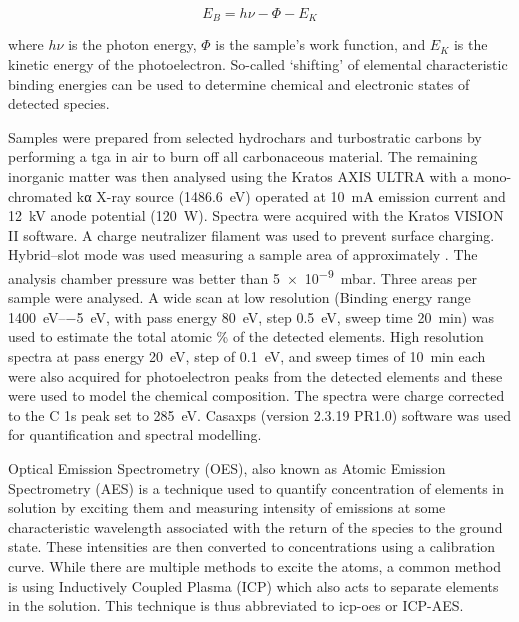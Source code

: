 \begin{equation}
    E_B = h\nu - \Phi - E_K
\end{equation}

where $h\nu$ is the photon energy, $\Phi$ is the sample’s work function, and $E_K$ is the kinetic energy of the photoelectron. So-called `shifting' of elemental characteristic binding energies can be used to determine chemical and electronic states of detected species.\citep{moulder1995handbook}

Samples were prepared from selected \glspl{hydrochar} and \glspl{turbostratic carbon} by performing a \acrshort{tga} in air to burn off all carbonaceous material. The remaining inorganic matter was then analysed using the Kratos AXIS ULTRA with a mono-chromated k\textgreek{α} X-ray source (\qty{1486.6}{\electronvolt}) operated at \qty{10}{\mA} emission current and \qty{12}{\kilo\volt} anode potential (\qty{120}{\watt}). Spectra were acquired with the Kratos VISION II software. A charge neutralizer filament was used to prevent surface charging. Hybrid–slot mode was used measuring a sample area of approximately . The analysis chamber pressure was better than \qty{5e-9}{\milli\bar}. Three areas per sample were analysed. A wide scan at low resolution (Binding energy range \qtyrange{1400}{-5}{\electronvolt}, with pass energy \qty{80}{\electronvolt}, step \qty{0.5}{\electronvolt}, sweep time \qty{20}{\minute}) was used to estimate the total atomic \% of the detected elements. High resolution spectra at pass energy \qty{20}{\electronvolt}, step of \qty{0.1}{\electronvolt}, and sweep times of \qty{10}{\minute} each were also acquired for photoelectron peaks from the detected elements and these were used to model the chemical composition. The spectra were charge corrected to the C 1s peak set to \qty{285}{\electronvolt}. Casaxps (version 2.3.19 PR1.0) software\citep{fairley2021systematic} was used for quantification and spectral modelling.

Optical Emission Spectrometry (OES), also known as Atomic Emission Spectrometry (AES) is a technique used to quantify concentration of elements in solution by exciting them and measuring intensity of emissions at some characteristic wavelength associated with the return of the species to the ground state. These intensities are then converted to concentrations using a calibration curve. While there are multiple methods to excite the atoms, a common method is using Inductively Coupled Plasma (ICP) which also acts to separate elements in the solution. This technique is thus abbreviated to \acrshort{icp-oes} or ICP-AES.\citep{Hinners1988interlaboratory}

